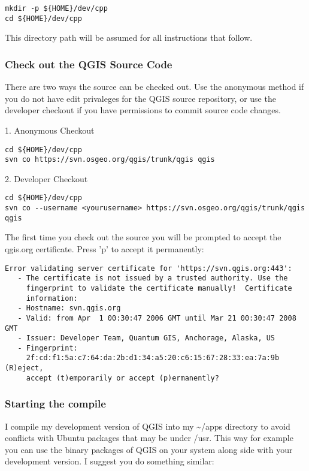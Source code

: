 \begin{verbatim}
mkdir -p ${HOME}/dev/cpp 
cd ${HOME}/dev/cpp 
\end{verbatim}

This directory path will be assumed for all instructions that follow.

\hypertarget{toc9}{}
\subsubsection{Check out the QGIS Source Code}
There are two ways the source can be checked out. Use the anonymous method
if you do not have edit privaleges for the QGIS source repository, or use
  the developer checkout if you have permissions to commit source code
  changes.

1. Anonymous Checkout

\begin{verbatim}
cd ${HOME}/dev/cpp 
svn co https://svn.osgeo.org/qgis/trunk/qgis qgis
\end{verbatim}

2. Developer Checkout

\begin{verbatim}
cd ${HOME}/dev/cpp 
svn co --username <yourusername> https://svn.osgeo.org/qgis/trunk/qgis qgis 
\end{verbatim}

The first time you check out the source you will be prompted to accept the
qgis.org certificate. Press 'p' to accept it permanently:

\begin{verbatim}
Error validating server certificate for 'https://svn.qgis.org:443':
   - The certificate is not issued by a trusted authority. Use the
     fingerprint to validate the certificate manually!  Certificate
     information:
   - Hostname: svn.qgis.org
   - Valid: from Apr  1 00:30:47 2006 GMT until Mar 21 00:30:47 2008 GMT
   - Issuer: Developer Team, Quantum GIS, Anchorage, Alaska, US
   - Fingerprint:
     2f:cd:f1:5a:c7:64:da:2b:d1:34:a5:20:c6:15:67:28:33:ea:7a:9b (R)eject,
     accept (t)emporarily or accept (p)ermanently?  
\end{verbatim}

\hypertarget{toc10}{}
\subsubsection{Starting the compile}
I compile my development version of QGIS into my \~{}/apps directory to avoid
conflicts with Ubuntu packages that may be under /usr. This way for example
you can use the binary packages of QGIS on your system along side with your
development version. I suggest you do something similar:

